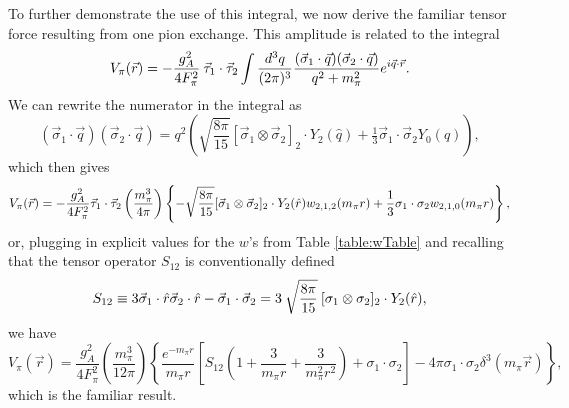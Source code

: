 To further demonstrate the use of this integral, we now derive the familiar tensor force resulting from one pion exchange. This amplitude is related to the integral
\begin{equation} 
V_\pi( \vec{r}) =  -\frac{g_A^2 }{4 F_\pi^2} \:\vec{\tau}_1\cdot\vec{\tau}_2 \int \frac{d^3 q } {(2 \pi)^3 } \frac{(\vec{\sigma}_1 \cdot \vec{q} ) (\vec{\sigma}_2 \cdot \vec{q} ) } {q^2+m_\pi^2} e^{i \vec{q} \cdot \vec{r} }. 
\end{equation}
We can rewrite the numerator in the integral as
\begin{equation} (\vec{\sigma}_1 \cdot \vec{q}) ( \vec{\sigma}_2 \cdot \vec{q} )= q^2 \left(\sqrt{\frac{8\pi}{15}} [\vec{\sigma}_1 \otimes \vec{\sigma}_2]_2 \cdot Y_2(\hat{q}) + \tfrac{1}{3} \vec{\sigma}_1 \cdot \vec{\sigma}_2  Y_0(\hat{q}) \right),\end{equation}
which then gives
\begin{equation} 
V_\pi( \vec{r}) = - \frac{g_A^2 }{4 F_\pi^2} \vec{\tau}_1\cdot\vec{\tau}_2 \left(\frac{m_\pi^3}{4 \pi}\right) \left\{ - \sqrt{\frac{8\pi}{15}} [\vec{\sigma}_1 \otimes \vec{\sigma}_2]_2 \cdot Y_2(\hat{r}) w_{2,1,2}(m_\pi r) + \frac{1}{3} \sigma_1 \cdot \sigma_2 w_{2,1,0}(m_\pi r ) \right\},  \end{equation}
or, plugging in explicit values for the $w$'s from Table \ref{table:wTable} and recalling that the tensor operator $S_{12}$ is conventionally defined
\begin{equation}
S_{12} \equiv   3\vec{\sigma}_1\cdot \hat{r}\vec{\sigma}_2\cdot \hat{r} -\vec{\sigma}_1\cdot\vec{\sigma}_2 = 3\:\sqrt{\frac{8\pi}{15}} \:[\sigma_1 \otimes \sigma_2]_2 \cdot Y_2(\hat{r}) , 
\end{equation}
we have
\begin{equation} V_\pi( \vec{r})= \frac{g_A^2 }{4 F_\pi^2}  \left(\frac{m_\pi^3}{12 \pi}\right) \left\{ \frac{e^{-m_\pi r}}{m_\pi r} \left[ S_{12}\left(1+\frac{3}{m_\pi r}+ \frac{3}{m_\pi^2 r^2} \right) +  \sigma_1 \cdot \sigma_2 \right] - 4\pi  \sigma_1 \cdot \sigma_2 \delta^3(m_\pi \vec{r}) \right\}, 
\end{equation}
which is the familiar result.


